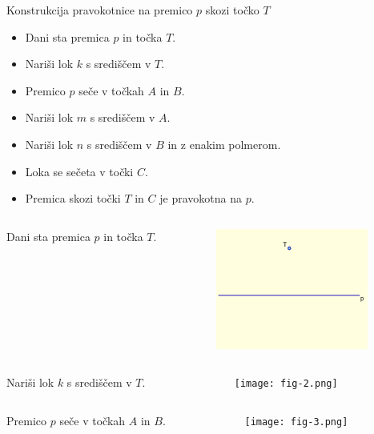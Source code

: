 \begin{frame}{Konstrukcija pravokotnice na premico $p$ skozi točko $T$}

		  \begin{itemize}
			 \item Dani sta premica $p$ in točka $T$.
			 \item Nariši lok $k$ s središčem v $T$.
			 \item Premico $p$ seče v točkah $A$ in $B$.
			 \item Nariši lok $m$ s središčem v $A$.
			 \item Nariši lok $n$ s središčem v $B$ in z enakim polmerom.
			 \item Loka se sečeta v točki $C$.
			 \item Premica skozi točki $T$ in $C$ je pravokotna na $p$.
		  \end{itemize}
\begin{columns}
	\begin{column}{0.55\textwidth}
		Dani sta premica $p$ in točka $T$.
	\end{column}
	\begin{column}{0.45\textwidth}
		\centering
		\includegraphics[width=50mm]{slike/fig-1.png}
	\end{column}
\end{columns}

		  
		\begin{columns}
		\begin{column}{0.55\textwidth}
			Nariši lok $k$ s središčem v $T$.
		\end{column}
			\begin{column}{0.45\textwidth}
				\centering
				\texttt{[image: fig-2.png]}
			\end{column}
		\end{columns}


		\begin{columns}
			\begin{column}{0.55\textwidth}
				Premico $p$ seče v točkah $A$ in $B$.
			\end{column}
				\begin{column}{0.45\textwidth}
					\centering
					\texttt{[image: fig-3.png]}
				\end{column}
			\end{columns}



\end{frame}
